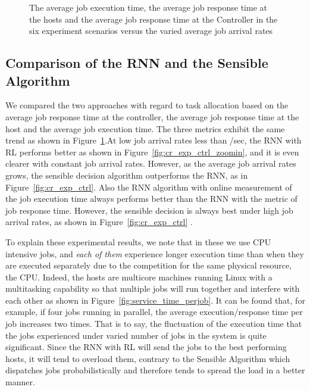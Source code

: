 \documentclass[journal]{IEEEtran}
\begin{document}
		\begin{figure}[ht]
     \centering
       
			\caption{The average job execution time, the average job response time at the hosts and the average job response time at the Controller in the six experiment scenarios versus the varied average job arrival rates }
			\label{fig:cr_exp}
     \end{figure}
		
		
	

\subsection{Comparison of the RNN and the Sensible Algorithm}
\label{performanceevaluationofrnnsensible}

We compared the two approaches with regard to task allocation based on the average job response time at the controller, the average job response time at the host and the average job execution time. The three metrics exhibit the same trend as shown in Figure~\ref{fig:cr_exp}.At low job arrival rates less than /sec, the RNN with RL performs better as shown in Figure~\ref{fig:cr_exp_ctrl_zoomin}, and it is even  clearer with constant job arrival rates. 
However, as the average job arrival rates grows, the sensible decision algorithm outperforms the RNN, as in Figure~\ref{fig:cr_exp_ctrl}. Also the RNN algorithm with online measurement of the job execution time always performs better than the RNN with the metric of job response time. However, the sensible decision is always best under high job arrival rates, as shown in Figure~\ref{fig:cr_exp_ctrl} .



To explain these experimental results, we note that in these  we use CPU intensive jobs, and  {\em each of them} experience longer execution time than when they are executed separately due to the competition for the same physical resource, the CPU. Indeed, the hosts are multicore machines running Linux  with a multitasking capability so that multiple jobs will run together and interfere with each other 
as shown in Figure~\ref{fig:service_time_perjob}. It can be found that, for example, if four jobs running in parallel, the average execution/response time per job increases two times. That is to say, the fluctuation of the execution time that the jobs experienced under varied number of jobs in the system is quite significant. Since the RNN with RL will send the jobs to the best performing hosts, it will tend to overload them, contrary to the Sensible Algorithm which dispatches jobs probabilistically and therefore tends to spread the load in a better manner. 
\end{document}
